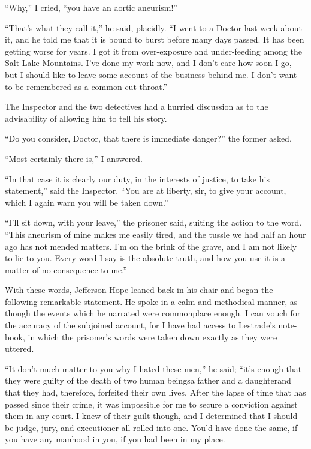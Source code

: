 \documentclass[12pt,english]{book}
\begin{document}
{}``Why,'' I cried, {}``you have an aortic aneurism!''

{}``That's what they call it,'' he said, placidly. {}``I went to
a Doctor last week about it, and he told me that it is bound to burst
before many days passed. It has been getting worse for years. I got
it from over-exposure and under-feeding among the Salt Lake Mountains.
I've done my work now, and I don't care how soon I go, but I should
like to leave some account of the business behind me. I don't want
to be remembered as a common cut-throat.''

The Inspector and the two detectives had a hurried discussion as to
the advisability of allowing him to tell his story.

{}``Do you consider, Doctor, that there is immediate danger?'' the
former asked.

{}``Most certainly there is,'' I answered.

{}``In that case it is clearly our duty, in the interests of justice,
to take his statement,'' said the Inspector. {}``You are at liberty,
sir, to give your account, which I again warn you will be taken down.''

{}``I'll sit down, with your leave,'' the prisoner said, suiting
the action to the word. {}``This aneurism of mine makes me easily
tired, and the tussle we had half an hour ago has not mended matters.
I'm on the brink of the grave, and I am not likely to lie to you.
Every word I say is the absolute truth, and how you use it is a matter
of no consequence to me.''

With these words, Jefferson Hope leaned back in his chair and began
the following remarkable statement. He spoke in a calm and methodical
manner, as though the events which he narrated were commonplace enough.
I can vouch for the accuracy of the subjoined account, for I have
had access to Lestrade's note-book, in which the prisoner's words
were taken down exactly as they were uttered.

{}``It don't much matter to you why I hated these men,'' he said;
{}``it's enough that they were guilty of the death of two human beings\mdsh{---}a
father and a daughter\mdsh{---}and that they had, therefore, forfeited
their own lives. After the lapse of time that has passed since their
crime, it was impossible for me to secure a conviction against them
in any court. I knew of their guilt though, and I determined that
I should be judge, jury, and executioner all rolled into one. You'd
have done the same, if you have any manhood in you, if you had been
in my place.
\end{document}
